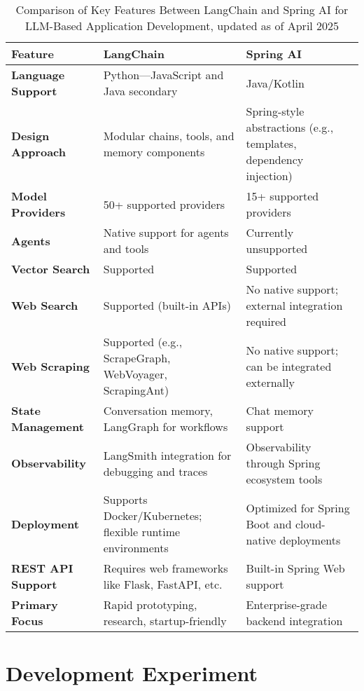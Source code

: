 \begin{table}[htbp]
\caption{Comparison of Key Features Between LangChain and Spring AI for LLM-Based Application Development, updated as of April 2025}
\label{tab:comparison}
\begin{center}
\begin{tabularx}{\linewidth}{|l|X|X|}
\hline
\textbf{Feature} & \textbf{LangChain} & \textbf{Spring AI} \\ \hline
\textbf{Language Support} & Python—JavaScript and Java secondary & Java/Kotlin \\ \hline
\textbf{Design Approach} & Modular chains, tools, and memory components & Spring-style abstractions (e.g., templates, dependency injection) \\ \hline
\textbf{Model Providers} & 50+ supported providers & 15+ supported providers \\ \hline
\textbf{Agents} & Native support for agents and tools & Currently unsupported \\ \hline
\textbf{Vector Search} & Supported & Supported \\ \hline
\textbf{Web Search} & Supported (built-in APIs) & No native support; external integration required \\ \hline
\textbf{Web Scraping} & Supported (e.g., ScrapeGraph, WebVoyager, ScrapingAnt) & No native support; can be integrated externally \\ \hline
\textbf{State Management} & Conversation memory, LangGraph for workflows & Chat memory support \\ \hline
\textbf{Observability} & LangSmith integration for debugging and traces & Observability through Spring ecosystem tools \\ \hline
\textbf{Deployment} & Supports Docker/Kubernetes; flexible runtime environments & Optimized for Spring Boot and cloud-native deployments \\ \hline
\textbf{REST API Support} & Requires web frameworks like Flask, FastAPI, etc. & Built-in Spring Web support \\ \hline
\textbf{Primary Focus} & Rapid prototyping, research, startup-friendly & Enterprise-grade backend integration \\ \hline
\end{tabularx}
\end{center}
\end{table}




\section*{Development Experiment}

